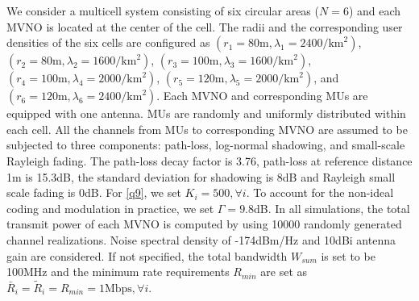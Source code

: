 \documentclass[journal]{IEEEtran}
\begin{document}
We consider a multicell system consisting of six circular areas ($N = 6$) and each MVNO is located at the center of the cell. The radii and the corresponding user densities of the six cells are configured as $(r_1 = 80\mbox{m}, \lambda_1 = 2400/\mbox{km}^2)$, $(r_2 = 80\mbox{m}, \lambda_2 = 1600/\mbox{km}^2)$, $(r_3 = 100\mbox{m}, \lambda_3 = 1600/\mbox{km}^2)$, $(r_4 = 100\mbox{m}, \lambda_4 = 2000/\mbox{km}^2)$, $(r_5 = 120\mbox{m}, \lambda_5 = 2000/\mbox{km}^2)$, and $(r_6 = 120\mbox{m}, \lambda_6 = 2400/\mbox{km}^2)$. Each MVNO and corresponding MUs are equipped with one antenna. MUs are randomly and uniformly distributed within each cell. All the channels from MUs to corresponding MVNO are assumed to be subjected to three components: path-loss, log-normal shadowing, and small-scale Rayleigh fading. The path-loss decay factor is 3.76, path-loss at reference distance 1m is 15.3dB, the standard deviation for shadowing is 8dB and Rayleigh small scale fading is 0dB. For \eqref{q9}, we set $K_i = 500, \forall i$. To account for the non-ideal coding and modulation in practice, we set $\Gamma = 9.8$dB. In all simulations, the total transmit power of each MVNO is computed by using 10000 randomly generated channel realizations. Noise spectral density of -174dBm/Hz and 10dBi antenna gain are considered. If not specified, the total bandwidth $W_{sum}$ is set to be 100MHz and the minimum rate requirements $R_{min}$ are set as $\bar{R}_i = \tilde{R}_i = R_{min} = 1\mbox{Mbps}, \forall i$.
\end{document}
